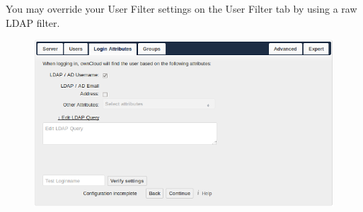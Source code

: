 \documentclass[letterpaper,10pt,english]{sphinxmanual}
\begin{document}
You may override your User Filter settings on the User Filter tab by using a raw
LDAP filter.
\begin{figure}[htbp]
\centering

\includegraphics{ldap-wizard-3-login.png}
\end{figure}
\end{document}
